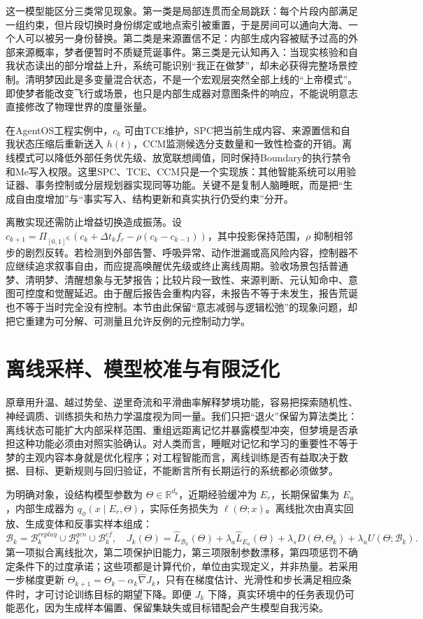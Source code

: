 这一模型能区分三类常见现象。第一类是局部连贯而全局跳跃：每个片段内部满足一组约束，但片段切换时身份绑定或地点索引被重置，于是房间可以通向大海、一个人可以被另一身份替换。第二类是来源置信不足：内部生成内容被赋予过高的外部来源概率，梦者便暂时不质疑荒诞事件。第三类是元认知再入：当现实核验和自我状态读出的部分增益上升，系统可能识别“我正在做梦”，却未必获得完整场景控制。清明梦因此是多变量混合状态，不是一个宏观层突然全部上线的“上帝模式”。即使梦者能改变飞行或场景，也只是内部生成器对意图条件的响应，不能说明意志直接修改了物理世界的度量张量。

在AgentOS工程实例中，$c_k$ 可由TCE维护，SPC把当前生成内容、来源置信和自我状态压缩后重新送入 $h(t)$，CCM监测候选分支数量和一致性检查的开销。离线模式可以降低外部任务优先级、放宽联想阈值，同时保持Boundary的执行禁令和Me写入权限。这里SPC、TCE、CCM只是一个实现族：其他智能系统可以用验证器、事务控制或分层规划器实现同等功能。关键不是复制人脑睡眠，而是把“生成自由度增加”与“事实写入、结构更新和真实执行仍受约束”分开。

离散实现还需防止增益切换造成振荡。设 $c_{k+1}=\Pi_{[0,1]^{d_c}}(c_k+\Delta t_k f_c-\rho(c_k-c_{k-1}))$，其中投影保持范围，$\rho$ 抑制相邻步的剧烈反转。若检测到外部告警、呼吸异常、动作泄漏或高风险内容，控制器不应继续追求叙事自由，而应提高唤醒优先级或终止离线周期。验收场景包括普通梦、清明梦、清醒想象与无梦报告；比较片段一致性、来源判断、元认知命中、意图可控度和觉醒延迟。由于醒后报告会重构内容，未报告不等于未发生，报告荒诞也不等于当时完全没有控制。本节由此保留“意志减弱与逻辑松弛”的现象问题，却把它重建为可分解、可测量且允许反例的元控制动力学。

\section{离线采样、模型校准与有限泛化}
\label{sec:section_5559}
原章用升温、越过势垒、逆里奇流和平滑曲率解释梦境功能，容易把探索随机性、神经调质、训练损失和热力学温度视为同一量。我们只把“退火”保留为算法类比：离线状态可能扩大内部采样范围、重组远距离记忆并暴露模型冲突，但梦境是否承担这种功能必须由对照实验确认。对人类而言，睡眠对记忆和学习的重要性不等于梦的主观内容本身就是优化程序；对工程智能而言，离线训练是否有益取决于数据、目标、更新规则与回归验证，不能断言所有长期运行的系统都必须做梦。

为明确对象，设结构模型参数为 $\Theta\in\mathbb R^{d_\theta}$，近期经验缓冲为 $E_r$，长期保留集为 $E_a$，内部生成器为 $q_\phi(x\mid E_r,\Theta)$，实际任务损失为 $\ell(\Theta;x)$。离线批次由真实回放、生成变体和反事实样本组成：
\[
\mathcal B_k=\mathcal B_k^{replay}\cup\mathcal B_k^{gen}\cup\mathcal B_k^{cf},
\quad
J_k(\Theta)=\widehat L_{\mathcal B_k}(\Theta)+\lambda_a\widehat L_{E_a}(\Theta)
+\lambda_s D(\Theta,\Theta_k)+\lambda_u U(\Theta;\mathcal B_k).
\]
第一项拟合离线批次，第二项保护旧能力，第三项限制参数漂移，第四项惩罚不确定条件下的过度承诺；这些项都是计算代价，单位由实现定义，并非热量。若采用一步梯度更新 $\Theta_{k+1}=\Theta_k-\alpha_k\widehat\nabla J_k$，只有在梯度估计、光滑性和步长满足相应条件时，才可讨论训练目标的期望下降。即便 $J_k$ 下降，真实环境中的任务表现仍可能恶化，因为生成样本偏置、保留集缺失或目标错配会产生模型自我污染。

